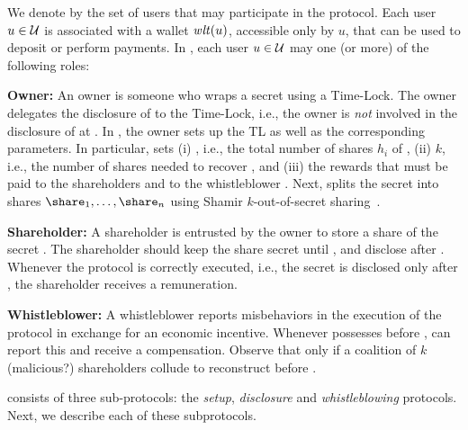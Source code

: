 %
We denote by \users the set of users that may participate in the \shortname protocol.
%
Each user $u \in {\ensuremath{\mathcal{U}}}$ is associated with a wallet $\mathit{wlt}(u)$, accessible only by $u$, that can be used to deposit or perform payments.
%
In \shortname, each user $u \in {\ensuremath{\mathcal{U}}}$ may   one (or more) of the following roles:
\begin{asparaitem}
\item {\bf Owner:}	An owner \owner is someone who wraps a secret \secret using a Time-Lock.
%
The owner delegates the disclosure of \secret to the Time-Lock, i.e., the owner is \textit{not} involved in the disclosure of \secret at \td. 
%
In \shortname, the owner \owner sets up the TL as well as the corresponding parameters.
%
In particular, \owner sets (i) \N, i.e., the total number of shares $h_i$ of \secret, (ii) $k$, i.e., the number of shares needed to recover \secret, and (iii) the rewards that must be paid to the shareholders \shareholder and to the whistleblower \whistleblower.
%
Next, \owner splits the secret  \secret  into \N shares $\share_1,\dots,\share_n$ using Shamir $k$-out-of-\N secret sharing~\cite{Shamir:1979:SS:359168.359176}.

\item {\bf Shareholder:}
%
A shareholder \shareholder is entrusted by the owner \owner to store a share \share of the secret \secret. 
%
The shareholder should keep the share \share secret until \td, and disclose \share after \td.
%
Whenever the protocol is correctly executed, i.e., the secret \secret is disclosed only after \td, the shareholder receives a remuneration.

\item {\bf Whistleblower:}
%
A whistleblower \whistleblower reports misbehaviors in the execution of the protocol in exchange for an economic incentive.
%
Whenever \whistleblower possesses \secret before \td, \whistleblower can report this and receive a compensation.
%
Observe that only if a coalition of $k$ (malicious?) shareholders collude to reconstruct \secret before \td. 
\end{asparaitem}


%
\shortname consists of three sub-protocols: the {\em setup},  {\em disclosure} and  {\em whistleblowing} protocols.
%
Next, we describe each of these subprotocols.






